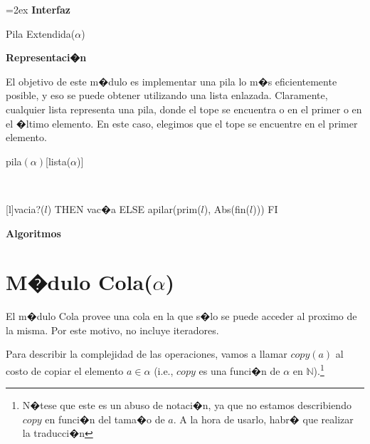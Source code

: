 \documentclass[a4paper,10pt]{article}
\newenvironment{Interfaz}{%
  \parskip=2ex%
  \noindent\textbf{\Large Interfaz}%
  \par%
}{}
\newenvironment{Representacion}{%
  \vspace*{2ex}%
  \noindent\textbf{\Large Representaci�n}%
  \vspace*{2ex}%
}{}
\newenvironment{Algoritmos}{%
  \vspace*{2ex}%
  \noindent\textbf{\Large Algoritmos}%
  \vspace*{2ex}%
}{}
\begin{document}
\begin{Interfaz}
  \begin{tad}{Pila Extendida($\alpha$)}
    \parskip=0pt
    
    \tadAxiomas
  \end{tad}

\end{Interfaz}

\begin{Representacion}
  
  El objetivo de este m�dulo es implementar una pila lo m�s eficientemente posible, y eso se puede obtener utilizando una lista enlazada.  Claramente, cualquier lista representa una pila, donde el tope se encuentra o en el primer o en el �ltimo elemento.  En este caso, elegimos que el tope se encuentre en el primer elemento.

  \begin{Estructura}{pila$(\alpha)$}[lista($\alpha$)]
  \end{Estructura}


  ~

  [l]{\IF vacia?($l$) THEN vac�a ELSE apilar(prim($l$), Abs(fin($l$))) FI}

\end{Representacion}

\begin{Algoritmos}
  
\end{Algoritmos}


\section{M�dulo Cola($\alpha$)}

El m�dulo Cola provee una cola en la que s�lo se puede acceder al proximo de la misma.  Por este motivo, no incluye iteradores.

Para describir la complejidad de las operaciones, vamos a llamar $copy(a)$ al costo de copiar el elemento $a \in \alpha$ (i.e., $copy$ es una funci�n de $\alpha$ en $\mathbb{N}$).\footnote{N�tese que este es un abuso de notaci�n, ya que no estamos describiendo $copy$ en funci�n del tama�o de $a$.  A la hora de usarlo, habr� que realizar la traducci�n}
\end{document}
